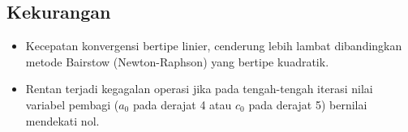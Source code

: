 \documentclass[12pt,a4paper]{article}
\begin{document}
\subsection{Kekurangan}
\begin{itemize}
  \item Kecepatan konvergensi bertipe linier, cenderung lebih lambat dibandingkan metode Bairstow (Newton-Raphson) yang bertipe kuadratik.
  \item Rentan terjadi kegagalan operasi jika pada tengah-tengah iterasi nilai variabel pembagi ($a_0$ pada derajat 4 atau $c_0$ pada derajat 5) bernilai mendekati nol.
\end{itemize}
\end{document}
